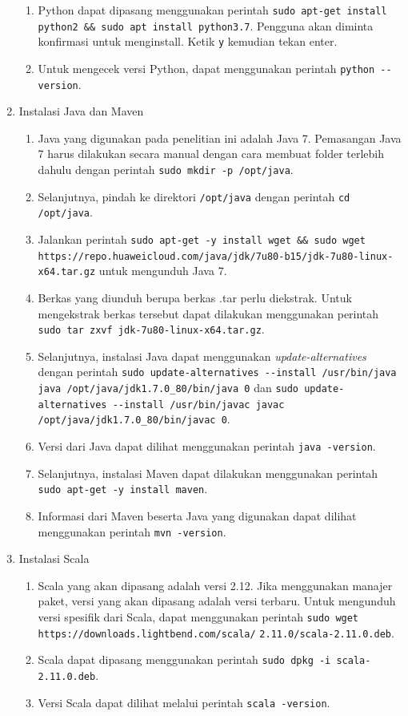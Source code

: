 \begin{enumerate}
  \begin{enumerate}
    \item Python dapat dipasang menggunakan perintah \verb|sudo apt-get install python2 && sudo apt install python3.7|. Pengguna akan diminta konfirmasi untuk menginstall. Ketik \verb|y| kemudian tekan enter.
    \item Untuk mengecek versi Python, dapat menggunakan perintah \verb|python --version|.
  \end{enumerate}
  \item Instalasi Java dan Maven
  \begin{enumerate}
    \item Java yang digunakan pada penelitian ini adalah Java 7. Pemasangan Java 7 harus dilakukan secara manual dengan cara membuat folder terlebih dahulu dengan perintah \verb|sudo mkdir -p /opt/java|. 
    \item Selanjutnya, pindah ke direktori \verb|/opt/java| dengan perintah \verb|cd /opt/java|.
    \item Jalankan perintah \verb|sudo apt-get -y install wget && sudo wget https://repo.huaweicloud.com/java/jdk/7u80-b15/jdk-7u80-linux-x64.tar.gz| untuk mengunduh Java 7.
    \item Berkas yang diunduh berupa berkas .tar perlu diekstrak. Untuk mengekstrak berkas tersebut dapat dilakukan menggunakan perintah \verb|sudo tar zxvf jdk-7u80-linux-x64.tar.gz|.
    \item Selanjutnya, instalasi Java dapat menggunakan \textit{update-alternatives} dengan perintah \verb|sudo update-alternatives --install /usr/bin/java java /opt/java/jdk1.7.0_80/bin/java 0| dan \verb|sudo update-alternatives --install /usr/bin/javac javac /opt/java/jdk1.7.0_80/bin/javac 0|.
    \item Versi dari Java dapat dilihat menggunakan perintah \verb|java -version|.
    \item Selanjutnya, instalasi Maven dapat dilakukan menggunakan perintah \verb| sudo apt-get -y install maven|.
    \item Informasi dari Maven beserta Java yang digunakan dapat dilihat menggunakan perintah \verb|mvn -version|.
  \end{enumerate}
  \item Instalasi Scala
  \begin{enumerate}
    \item Scala yang akan dipasang adalah versi 2.12. Jika menggunakan manajer paket, versi yang akan dipasang adalah versi terbaru. Untuk mengunduh versi spesifik dari Scala, dapat menggunakan perintah \verb|sudo wget  https://downloads.lightbend.com/scala/| \verb|2.11.0/scala-2.11.0.deb|.
    \item Scala dapat dipasang menggunakan perintah \verb|sudo dpkg -i scala-2.11.0.deb|.
    \item Versi Scala dapat dilihat melalui perintah \verb|scala -version|.
  \end{enumerate}
\end{enumerate}